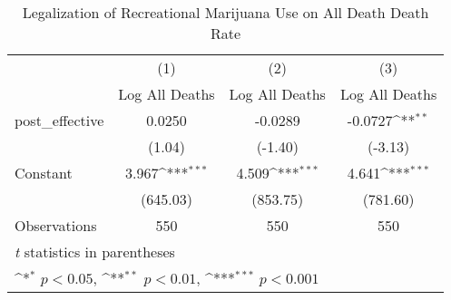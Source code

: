 \begin{table}[htbp]\centering
\def\sym#1{\ifmmode^{#1}\else\(^{#1}\)\fi}
\caption{Legalization of Recreational Marijuana Use on All Death Death Rate}
\begin{tabular}{l*{3}{c}}
\hline\hline
                    &\multicolumn{1}{c}{(1)}&\multicolumn{1}{c}{(2)}&\multicolumn{1}{c}{(3)}\\
                    &\multicolumn{1}{c}{Log All Deaths}&\multicolumn{1}{c}{Log All Deaths}&\multicolumn{1}{c}{Log All Deaths}\\
\hline
post\_effective      &      0.0250         &     -0.0289         &     -0.0727\sym{**} \\
                    &      (1.04)         &     (-1.40)         &     (-3.13)         \\
[1em]
Constant            &       3.967\sym{***}&       4.509\sym{***}&       4.641\sym{***}\\
                    &    (645.03)         &    (853.75)         &    (781.60)         \\
\hline
Observations        &         550         &         550         &         550         \\
\hline\hline
\multicolumn{4}{l}{\footnotesize \textit{t} statistics in parentheses}\\
\multicolumn{4}{l}{\footnotesize \sym{*} \(p<0.05\), \sym{**} \(p<0.01\), \sym{***} \(p<0.001\)}\\
\end{tabular}
\end{table}
